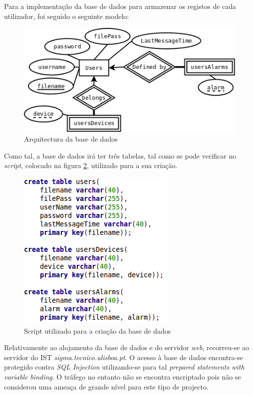 \documentclass[a4paper]{article}
\begin{document}
Para a implementação da base de dados para armazenar os registos de cada utilizador, foi seguido o seguinte modelo:

\begin{figure}[H]
  \centering
  \includegraphics[scale=0.40]{DB-ER.png}
  \caption{Arquitectura da base de dados}
  \label{fig:db-er}
\end{figure}

Como tal, a base de dados irá ter três tabelas, tal como se pode verificar no \textit{script}, colocado na figura \ref{fig:db-script}, utilizado para a sua criação.

\begin{figure}[H]
  \centering
  \includegraphics[scale=0.50]{DB-script.png}
  \caption{Script utilizado para a criação da base de dados}
  \label{fig:db-script}
\end{figure}

Relativamente ao alojamento da base de dados e do servidor \textit{web}, recorreu-se ao servidor do IST \textit{sigma.tecnico.ulisboa.pt}. O acesso à base de dados encontra-se protegido contra \textit{SQL Injection} utilizando-se para tal \textit{prepared statements with variable binding}. O tráfego no entanto não se encontra encriptado pois não se considerou uma ameaça de grande nível para este tipo de projecto.
\end{document}
